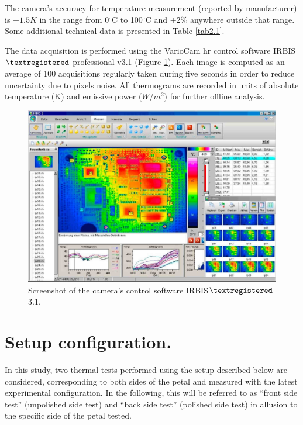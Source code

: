 		The camera’s accuracy for temperature measurement (reported by manufacturer) is $\pm 1.5 K$ in the range from 0$^\circ$C to 100$^\circ$C and $\pm2$\% anywhere outside that range. Some additional technical data is presented in Table \ref{tab2.1}.
		
		The data acquisition is performed using the VarioCam hr control software IRBIS$\textregistered$ professional v3.1 (Figure \ref{fig2.6}). Each image is computed as an average of 100 acquisitions regularly taken during five seconds in order to reduce uncertainty due to pixels noise. All thermograms are recorded in units of absolute temperature (K) and emissive power ($W/m^2$) for further offline analysis.
		
		\begin{figure}[ht!]
			\centering
			\captionsetup{justification=centering,margin=2cm}
			\includegraphics[scale=0.25]{Figures/Chapter02/IRBISimage.jpg}
			\caption{Screenshot of the camera’s control software IRBIS$\textregistered$ 3.1.}\label{fig2.6}
		\end{figure}\bigskip
		
	\section{Setup configuration.}\label{section2.4}
	
		In this study, two thermal tests performed using the setup described below are considered, corresponding to both sides of the petal and measured with the latest experimental configuration. 
		In the following, this will be referred to as “front side test” (unpolished side test) and “back side test” (polished side test) in allusion to the specific side of the petal tested. 
		
